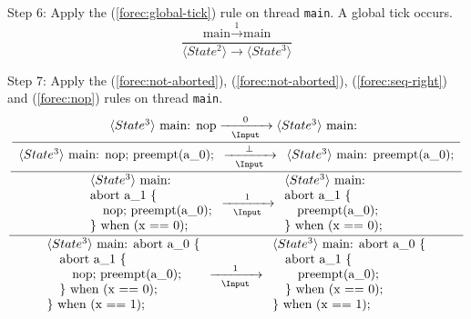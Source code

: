 \noindent
Step 6: Apply the (\ref{forec:global-tick}) rule on thread
\verb$main$. A global tick occurs.
\begin{equation*}
	\frac{
			\text{main} \xrightarrow{~~1~~} \text{main}
		}{
			\langle State^2 \rangle \xrightarrow{~~~~~} \langle State^3 \rangle
		}
\end{equation*}

\noindent
Step 7: Apply the (\ref{forec:not-aborted}), (\ref{forec:not-aborted}), (\ref{forec:seq-right}) and 
(\ref{forec:nop}) rules on thread \verb$main$.
\begin{equation*}
	\frac{
		\dfrac{
			\dfrac{
					\langle State^3 \rangle ~ \text{main: nop}
						\xrightarrow[~~\Input~~]{0}
					\langle State^3 \rangle ~ \text{main: }
				}{
					\begin{array}{l}
						\langle State^3 \rangle ~ \text{main: nop; preempt(a\_0);}				
					\end{array}
						\xrightarrow[~~\Input~~]{\bot} 
					\begin{array}{l}
						\langle State^3 \rangle ~ \text{main: preempt(a\_0);}				
					\end{array}
				}
			}{
				\begin{array}{l}
					\langle State^3 \rangle ~ \text{main:}		\\
					\text{abort a\_1 \{}						\\
					\text{~~~nop; preempt(a\_0);}				\\
					\text{\} when (x == 0);}					
				\end{array}
					\xrightarrow[~~\Input~~]{1} 
				\begin{array}{l}
					\langle State^3 \rangle ~ \text{main:}		\\
					\text{abort a\_1 \{}						\\
					\text{~~~preempt(a\_0);}					\\
					\text{\} when (x == 0);}					
				\end{array}
			}
		}{
			\begin{array}{l}
				\langle State^3 \rangle ~ \text{main: abort a\_0 \{}	\\
				\text{~~~abort a\_1 \{}									\\
				\text{~~~~~~nop; preempt(a\_0);}						\\
				\text{~~~\} when (x == 0);}								\\
				\text{\} when (x == 1);}
			\end{array}
				\xrightarrow[~~\Input~~]{1} 
			\begin{array}{l}
				\langle State^3 \rangle ~ \text{main: abort a\_0 \{}\\
				\text{~~~abort a\_1 \{}								\\
				\text{~~~~~~preempt(a\_0);}							\\
				\text{~~~\} when (x == 0);}							\\
				\text{\} when (x == 1);}
			\end{array}
		}
\end{equation*}

